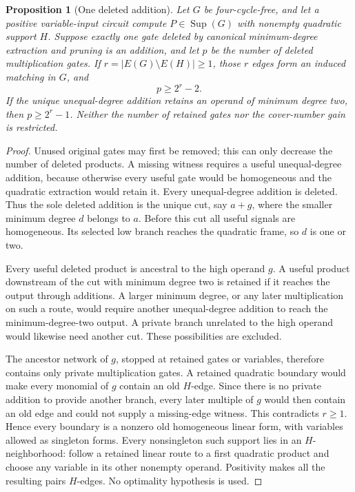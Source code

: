 \documentclass[11pt]{article}
\newcommand{\Sup}{\operatorname{Sup}}
\newtheorem{proposition}[theorem]{Proposition}
\theoremstyle{definition}
\theoremstyle{remark}
\begin{document}
\begin{proposition}[One deleted addition]\label{prop:oneadditionall}
Let $G$ be four-cycle-free, and let a positive variable-input circuit compute $P\in\Sup(G)$ with nonempty quadratic support $H$. Suppose exactly one gate deleted by canonical minimum-degree extraction and pruning is an addition, and let $p$ be the number of deleted multiplication gates. If $r=|E(G)\setminus E(H)|\ge1$, those $r$ edges form an induced matching in $G$, and
\[
 p\ge2^r-2.
\]
If the unique unequal-degree addition retains an operand of minimum degree two, then $p\ge2^r-1$. Neither the number of retained gates nor the cover-number gain is restricted.
\end{proposition}
\begin{proof}
Unused original gates may first be removed; this can only decrease the number of deleted products. A missing witness requires a useful unequal-degree addition, because otherwise every useful gate would be homogeneous and the quadratic extraction would retain it. Every unequal-degree addition is deleted. Thus the sole deleted addition is the unique cut, say $a+g$, where the smaller minimum degree $d$ belongs to $a$. Before this cut all useful signals are homogeneous. Its selected low branch reaches the quadratic frame, so $d$ is one or two.

Every useful deleted product is ancestral to the high operand $g$. A useful product downstream of the cut with minimum degree two is retained if it reaches the output through additions. A larger minimum degree, or any later multiplication on such a route, would require another unequal-degree addition to reach the minimum-degree-two output. A private branch unrelated to the high operand would likewise need another cut. These possibilities are excluded.

The ancestor network of $g$, stopped at retained gates or variables, therefore contains only private multiplication gates. A retained quadratic boundary would make every monomial of $g$ contain an old $H$-edge. Since there is no private addition to provide another branch, every later multiple of $g$ would then contain an old edge and could not supply a missing-edge witness. This contradicts $r\ge1$. Hence every boundary is a nonzero old homogeneous linear form, with variables allowed as singleton forms. Every nonsingleton such support lies in an $H$-neighborhood: follow a retained linear route to a first quadratic product and choose any variable in its other nonempty operand. Positivity makes all the resulting pairs $H$-edges. No optimality hypothesis is used.


\end{proof}
\end{document}
